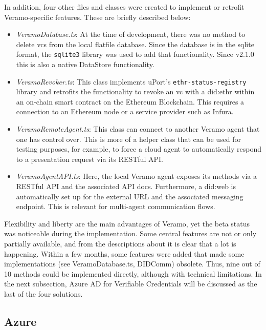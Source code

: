         In addition, four other files and classes were created to implement or retrofit Veramo-specific features. These are briefly described below:
    
        \begin{itemize}
            \item \textit{VeramoDatabase.ts}: At the time of development, there was no method to delete \acp{vc} from the local flatfile database. Since the database is in the sqlite format, the \texttt{sqlite3} library was used to add that functionality. Since v2.1.0 this is also a native DataStore functionality.
            \item \textit{VeramoRevoker.ts}: This class implements uPort's \texttt{ethr-status-registry} library and retrofits the functionality to revoke an \ac{vc} with a did:ethr within an on-chain smart contract on the Ethereum Blockchain. This requires a connection to an Ethereum node or a service provider such as Infura.
            \item \textit{VeramoRemoteAgent.ts}: This class can connect to another Veramo agent that one has control over. This is more of a helper class that can be used for testing purposes, for example, to force a cloud agent to automatically respond to a presentation request via its RESTful API.
            \item \textit{VeramoAgentAPI.ts}: Here, the local Veramo agent exposes its methods via a RESTful API and the associated API docs. Furthermore, a did:web is automatically set up for the external URL and the associated messaging endpoint. This is relevant for multi-agent communication flows.
        \end{itemize}
    
        Flexibility and liberty are the main advantages of Veramo, yet the beta status was noticeable during the implementation. Some central features are not or only partially available, and from the descriptions about it is clear that a lot is happening. Within a few months, some features were added that made some implementations (see VeramoDatabase.ts, DIDComm) obsolete. Thus, nine out of 10 methods could be implemented directly, although with technical limitations. In the next subsection, Azure AD for Verifiable Credentials will be discussed as the last of the four solutions. 
    
        \subsection{Azure}
        
